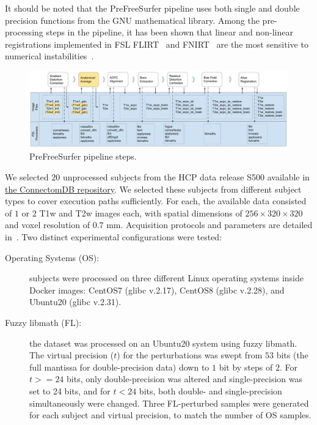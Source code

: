 It should be noted that the PreFreeSurfer pipeline uses both single and double
precision functions from the GNU mathematical library. Among the pre-processing steps in the pipeline, it has been shown
that linear and non-linear registrations implemented in FSL
FLIRT~\cite{jenkinson2001global,jenkinson2002improved} and FNIRT~\cite{andersson2007non}
are the most sensitive to numerical instabilities~\cite{salari2020spot}. 

\begin{figure}[t]
  \centering
  \includegraphics[width=\columnwidth]{chapters/chapter2/figures/PFS-pipeline-steps.pdf}
  \caption{PreFreeSurfer pipeline steps.
  }
  \label{fig:pfs-steps}
\end{figure}


We selected $20$ unprocessed subjects from the HCP data release S500 available
in \href{https://db.humanconnectome.org}{the ConnectomDB repository}.
We selected these subjects from different subject types to cover execution paths sufficiently.
For each, the available data consisted of $1$ or $2$ T1w and T2w
images each, with spatial dimensions of $256 \times 320 \times 320$ and voxel
resolution of $0.7$ mm. Acquisition protocols and parameters are detailed
in~\cite{van2013wu}.
Two distinct experimental configurations were tested:
\begin{description}
  \item[Operating Systems (OS):] 
        subjects were processed on three different Linux
        operating systems inside Docker images: CentOS7 (glibc v.2.17), CentOS8 (glibc
        v.2.28), and Ubuntu20 (glibc v.2.31).
  \item[Fuzzy libmath (FL):] the dataset was processed on an Ubuntu20
        system using fuzzy libmath. The virtual precision ($t$) for the
        perturbations was swept from $53$ bits (the full mantissa for double-precision
        data) down to $1$ bit by steps of $2$. For $t>=24$ bits, only double-precision
        was altered and single-precision was set to 24 bits, and for $t<24$ bits,
        both double- and single-precision simultaneously were changed.
        Three FL-perturbed samples were generated for each subject and
        virtual precision, to match the number of OS samples.
\end{description}

